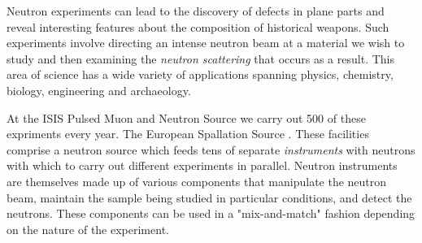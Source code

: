 Neutron experiments can lead to the discovery of defects in plane parts and reveal interesting features about the composition of historical weapons. Such experiments involve directing an intense neutron beam at a material we wish to study and then examining the \textit{neutron scattering} that occurs as a result. This area of science has a wide variety of applications spanning physics, chemistry, biology, engineering and archaeology.

At the ISIS Pulsed Muon and Neutron Source we carry out 500 of these expriments every year. The European Spallation Source . These facilities comprise a neutron source which feeds tens of separate \textit{instruments} with neutrons with which to carry out different experiments in parallel. Neutron instruments are themselves made up of various components that manipulate the neutron beam, maintain the sample being studied in particular conditions, and detect the neutrons. These components can be used in a "mix-and-match" fashion depending on the nature of the experiment.

\iffalse
As different researchers will have different things they wish to investigate, the components that are used in an experiment and the way in which they're used will vary from experiment to experiment in a ``mix-and-match" fashion.

In order to analyse the results of neutron experiments reliably we need a record of the \textit{experiment configuration}. This means an accurate description of the detected neutrons and conditions of the sample, but also the precise geometry of the components in the neutron instrument which was used. This information is stored in NeXus files. The \textit{NeXus Constructor} is an application under development to allow scientists to define the instrument geometry and precisely what data should be recorded during an experiment.
\fi

